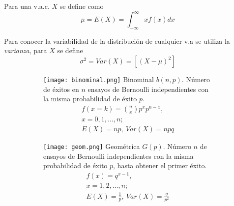 Para una v.a.c. $X$ se define como
\begin{equation}
\mu=E(X)=\int_{-\infty}^{\infty}xf(x)dx
\end{equation}

Para conocer la variabilidad de la distribución de cualquier v.a se utiliza la \emph{varianza}, para $X$ se define
\begin{equation}
\sigma^2=Var(X)=[{(X-\mu)}^2]
\end{equation}


\begin{figure}[H]\caption[Distribuciones]{Existe diversidad de distribuciones para modelar v.a.s, a continuación se muestran las mas importantes de acuerdo a \citeauthor{bala20} (\citeyear{bala20}).}\label{FIG:DISTS}
\begin{subfigure}[t]{.475\textwidth}\texttt{[image: binominal.png]}
Binominal $b(n,p)$. Número de éxitos en $n$ ensayos de Bernoulli independientes con la misma probabilidad de éxito $p$.
\begin{equation}\begin{matrix}
f(x=k)=\binom{n}{x}p^xp^{n-x},\\
x=0,1,\ldots,n;\\
E(X)=np,\ Var(X)=npq
\end{matrix}\end{equation}\end{subfigure}\qquad
\begin{subfigure}[t]{.475\textwidth}\texttt{[image: geom.png]}
Geométrica $G(p)$.
Número $n$ de ensayos de Bernoulli independientes con la misma probabilidad de éxito $p$, hasta obtener el primer éxito.
\begin{equation}\begin{matrix}
f(x)=q^{x-1},\\
x=1,2,\ldots,n;\\
E(X)=\frac{1}{p},\ Var(X)=\frac{q}{p^2}
\end{matrix}\end{equation}\end{subfigure}
\end{figure}


